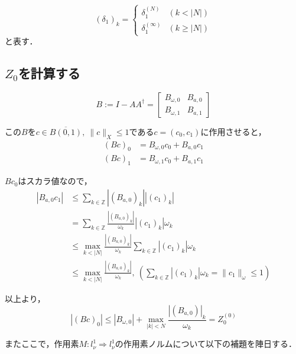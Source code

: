 \begin{equation*}
  \left( \delta_1 \right)_k = \begin{cases}
    \delta_1^{(N)}      & (k<|N|)      \\
    \delta_1^{(\infty)} & (k \geq |N|)
  \end{cases}
\end{equation*}
と表す．

\subsection{$Z_0$を計算する}
\begin{equation*}
  B := I - AA^\dagger = \begin{bmatrix}
    B_{\omega,0} & B_{a,0} \\
    B_{\omega,1} & B_{a,1}
  \end{bmatrix}
\end{equation*}

この$Bをc\in \overline{B(0,1)},\ \|c\|_X \leq 1$である$c=(c_0,c_1)$に作用させると，
\begin{align*}
  (Bc)_0 & = B_{\omega,0} c_0 + B_{a,0} c_1 \\
  (Bc)_1 & = B_{\omega,1} c_0 + B_{a,1} c_1
\end{align*}

$Bc_0$はスカラ値なので，
\begin{align*}
  \left| B_{a,0}c_1 \right| & \leq \sum_{k \in \mathbb{Z}} \left|(B_{a,0})_k\right| \left|(c_1)_k \right|                                                            \\
                            & = \sum_{k \in \mathbb{Z}} \frac{|(B_{a,0})_k|}{\omega_k} |(c_1)_k| \omega_k                                                            \\
                            & \leq \max_{k < |N|} \frac{|(B_{a,0})_k|}{\omega_k} \sum_{k \in \mathbb{Z}} |(c_1)_k| \omega_k                                          \\
                            & \leq \max_{k < |N|} \frac{|(B_{a,0})_k|}{\omega_k},\ \left( \sum_{k \in \mathbb{Z}} |(c_1)_k| \omega_k = \|c_1\|_\omega \leq 1 \right)
\end{align*}

以上より，
\begin{equation*}
  |(Bc)_0| \leq |B_{\omega,0}| + \max_{|k| < N} \frac{|(B_{a,0})|_k}{\omega_k} = Z_0^{(0)}
\end{equation*}

またここで，作用素$M:l_\nu^1 \Rightarrow l_\nu^1 $の作用素ノルムについて以下の補題を陣日する．


